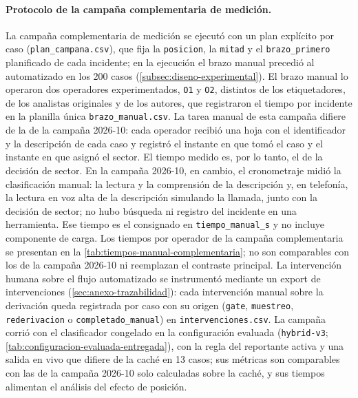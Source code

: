 \paragraph{Protocolo de la campaña complementaria de medición.} La campaña complementaria de medición se ejecutó con un plan explícito por caso (\texttt{plan\_campana.csv}), que fija la \texttt{posicion}, la \texttt{mitad} y el \texttt{brazo\_primero} planificado de cada incidente; en la ejecución el brazo manual precedió al automatizado en los 200 casos (\autoref{subsec:diseno-experimental}). El brazo manual lo operaron dos operadores experimentados, \texttt{O1} y \texttt{O2}, distintos de los etiquetadores, de los analistas originales y de los autores, que registraron el tiempo por incidente en la planilla única \texttt{brazo\_manual.csv}. La tarea manual de esta campaña difiere de la de la campaña 2026-10: cada operador recibió una hoja con el identificador y la descripción de cada caso y registró el instante en que tomó el caso y el instante en que asignó el sector. El tiempo medido es, por lo tanto, el de la decisión de sector. En la campaña 2026-10, en cambio, el cronometraje midió la clasificación manual: la lectura y la comprensión de la descripción y, en telefonía, la lectura en voz alta de la descripción simulando la llamada, junto con la decisión de sector; no hubo búsqueda ni registro del incidente en una herramienta. Ese tiempo es el consignado en \texttt{tiempo\_manual\_s} y no incluye componente de carga. Los tiempos por operador de la campaña complementaria se presentan en la \autoref{tab:tiempos-manual-complementaria}; no son comparables con los de la campaña 2026-10 ni reemplazan el contraste principal. La intervención humana sobre el flujo automatizado se instrumentó mediante un export de intervenciones (\autoref{sec:anexo-trazabilidad}): cada intervención manual sobre la derivación queda registrada por caso con su origen (\texttt{gate}, \texttt{muestreo}, \texttt{rederivacion} o \texttt{completado\_manual}) en \texttt{intervenciones.csv}. La campaña corrió con el clasificador congelado en la configuración evaluada (\texttt{hybrid-v3}; \autoref{tab:configuracion-evaluada-entregada}), con la regla del reportante activa y una salida en vivo que difiere de la caché en 13 casos; sus métricas son comparables con las de la campaña 2026-10 solo calculadas sobre la caché, y sus tiempos alimentan el análisis del efecto de posición.

